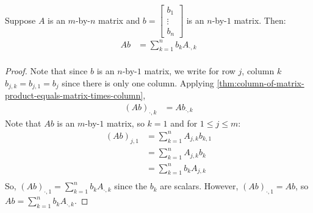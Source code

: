 \documentclass{article}
\begin{document}
\begin{theorem}
  \label{thm:matrix-multiplication-linear-combination-of-columns}
  Suppose $A$ is an $m$-by-$n$ matrix and $b =
    \begin{bmatrix}
      b_1 \\
      \vdots \\
      b_n
    \end{bmatrix}
    $ is an $n$-by-$1$ matrix. Then:
    \begin{align*}
      Ab &= \sum_{k=1}^n b_k A_{\cdot, k} \\
    \end{align*}
\end{theorem}
\begin{proof}
  Note that since $b$ is an $n$-by-$1$ matrix, we write for row $j$,
  column $k$ $b_{j,k} = b_{j,1} = b_j$ since there is only one
  column. Applying
  \cref{thm:column-of-matrix-product-equals-matrix-times-column},
  \begin{align*}
    (Ab)_{\cdot, k} &= Ab_{\cdot, k}
  \end{align*}
  Note that $Ab$ is an $m$-by-$1$ matrix, so $k = 1$ and for $1 \le j
  \le m$:
  \begin{align*}
    (Ab)_{j, 1} &= \sum_{k=1}^n A_{j, k}b_{k, 1} \\
                &= \sum_{k=1}^n A_{j, k}b_k \\
                &= \sum_{k=1}^n b_k A_{j, k} \\
  \end{align*}
  So, $(Ab)_{\cdot, 1} = \sum_{k=1}^n b_k A_{\cdot, k}$ since the
  $b_k$ are scalars. However, $(Ab)_{\cdot, 1} = Ab$, so $Ab =
  \sum_{k=1}^n b_k A_{\cdot, k}$.
\end{proof}
\end{document}
